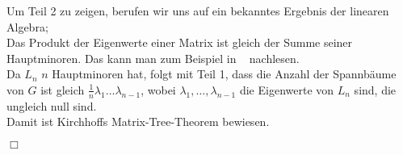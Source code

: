 Um Teil 2 zu zeigen, berufen wir uns auf ein bekanntes Ergebnis der linearen Algebra; \\
Das Produkt der Eigenwerte einer Matrix ist gleich der Summe seiner Hauptminoren. Das kann man zum Beispiel in ~\cite{meyer_2005} nachlesen. \\
Da $L_n$ $n$ Hauptminoren hat, folgt mit Teil 1, dass die Anzahl der Spannbäume von $G$ ist gleich $\frac{1}{n}\lambda_1\ldots\lambda_{n-1}$, wobei $\lambda_1,\ldots,\lambda_{n-1}$ die Eigenwerte von $L_n$ sind, die ungleich null sind. \\
Damit ist Kirchhoffs Matrix-Tree-Theorem bewiesen.
\begin{flushright} $\Box$ \end{flushright} 
 
